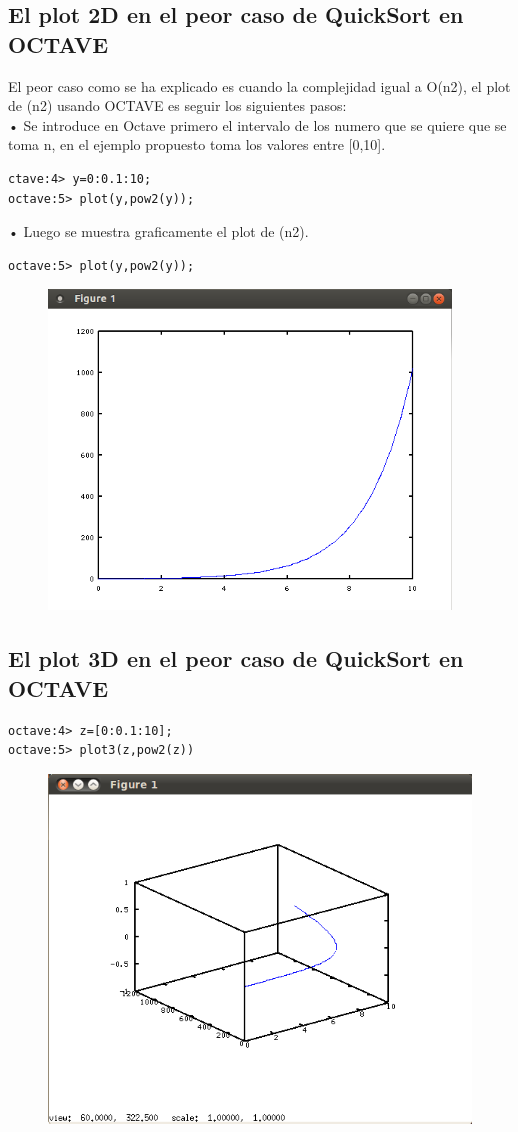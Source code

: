 \documentclass[a4,12pt]{article}
\begin{document}
\subsection{El plot 2D en el peor caso de QuickSort en OCTAVE}
El peor caso como se ha explicado es cuando la complejidad igual a O(n2), el plot de (n2) usando OCTAVE es seguir los siguientes pasos:\\
• Se introduce en Octave primero el intervalo de los numero que se quiere que se toma n, en el ejemplo propuesto toma los valores entre [0,10].\\

\begin{verbatim}
ctave:4> y=0:0.1:10;
octave:5> plot(y,pow2(y));
\end{verbatim}

• Luego se muestra graficamente el plot de (n2).\\
\begin{verbatim}
octave:5> plot(y,pow2(y));
\end{verbatim}
\begin{figure}[H]
  \centering
    \includegraphics{imagenes/plot2}
\end{figure}

\subsection{El plot 3D en el peor caso de QuickSort en OCTAVE}
\begin{verbatim}
octave:4> z=[0:0.1:10];
octave:5> plot3(z,pow2(z))
\end{verbatim}
\begin{figure}[H]
  \centering
    \includegraphics{imagenes/plot3}
\end{figure}
\end{document}
